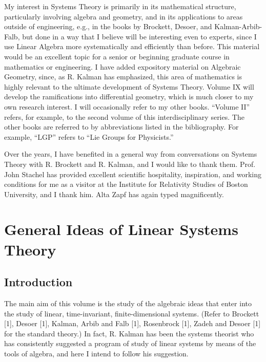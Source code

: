 \documentclass[12pt]{book}
\theoremstyle{plain}
\theoremstyle{definition}
\begin{document}
My interest in Systems Theory is primarily in its mathematical structure, particularly involving algebra and geometry, and in its applications to areas outside of engineering, e.g., in the books by Brockett, Desoer, and Kalman-Arbib-Falb, but done in a way that I believe will be interesting even to experts, since I use Linear Algebra more systematically and efficiently than before. This material would be an excellent topic for a senior or beginning graduate course in mathematics or engineering. I have added expository material on Algebraic Geometry, since, as R. Kalman has emphasized, this area of mathematics is highly relevant to the ultimate development of Systems Theory. Volume IX will develop the ramifications into differential geometry, which is much closer to my own research interest. I will occasionally refer to my other books. ``Volume II'' refers, for example, to the second volume of this interdisciplinary series. The other books are referred to by abbreviations listed in the bibliography. For example, ``LGP'' refers to ``Lie Groups for Physicists.''

Over the years, I have benefited in a general way from conversations on Systems Theory with R. Brockett and R. Kalman, and I would like to thank them. Prof. John Stachel has provided excellent scientific hospitality, inspiration, and working conditions for me as a visitor at the Institute for Relativity Studies of Boston University, and I thank him. Alta Zapf has again typed magnificently.

\chapter{General Ideas of Linear Systems Theory}

\section{Introduction}

The main aim of this volume is the study of the algebraic ideas that enter into the study of linear, time-invariant, finite-dimensional systems.
(Refer to Brockett [1], Desoer [1], Kalman, Arbib and Falb [1], Rosenbrock [1], Zadeh and Desoer [1] for the standard theory.) %
In fact, R. Kalman has been the systems theorist who has consistently suggested a program of study of linear systems by means of the tools of algebra, and here I intend to follow his suggestion.
\end{document}
